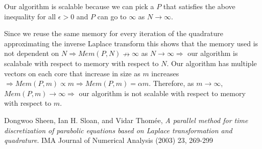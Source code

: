 \documentclass[letterpaper, 12pt]{article}
\begin{document}
	Our algorithm is scalable because we can pick a $P$ that satisfies the above inequality for all $\epsilon > 0$ and $P$ can go to $\infty$ as $N \rightarrow \infty$.
	
	Since we reuse the same memory for every iteration of the quadrature approximating the inverse Laplace transform this shows that the memory used is not dependent on $N \Rightarrow Mem(P,N) \nrightarrow \infty$ as $N \rightarrow \infty \Rightarrow$ our algorithm is scalabale with respect to memory with respect to $N$. Our algorithm has multiple vectors on each core that increase in size as $m$ increases $ \Rightarrow Mem(P,m) \varpropto m \Rightarrow Mem(P,m) = \alpha m$. Therefore, as $m \rightarrow \infty$, $Mem(P,m) \rightarrow \infty \Rightarrow$ our algorithm is not scalable with respect to memory with respect to $m$.
	
	\begin{thebibliography}{1}
			Dongwoo Sheen, Ian H. Sloan, and Vidar Thom\'{e}e,
			\emph{A parallel method for time discretization of parabolic equations based on Laplace transformation and quadrature}.
			IMA Journal of Numerical Analysis (2003) 23,
			269-299
			
	\end{thebibliography}
	
\end{document}
